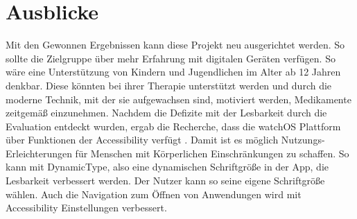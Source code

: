 \section{Ausblicke}
Mit den Gewonnen Ergebnissen kann diese Projekt neu ausgerichtet werden. So sollte die Zielgruppe über mehr Erfahrung mit digitalen Geräten verfügen. So wäre eine Unterstützung von Kindern und Jugendlichen im Alter ab 12 Jahren denkbar. Diese könnten bei ihrer Therapie unterstützt werden und durch die moderne Technik, mit der sie aufgewachsen sind, motiviert werden, Medikamente zeitgemäß einzunehmen.
Nachdem die Defizite mit der Lesbarkeit durch die Evaluation entdeckt wurden, ergab die Recherche, dass die watchOS Plattform über Funktionen der Accessibility verfügt \cite{Apple:watchAccess} . Damit ist es möglich Nutzungs-Erleichterungen für Menschen mit Körperlichen Einschränkungen zu schaffen. So kann mit DynamicType, also eine dynamischen Schriftgröße in der App, die Lesbarkeit verbessert werden. Der Nutzer kann so seine eigene Schriftgröße wählen. Auch die Navigation zum Öffnen von Anwendungen wird mit Accessibility Einstellungen verbessert.